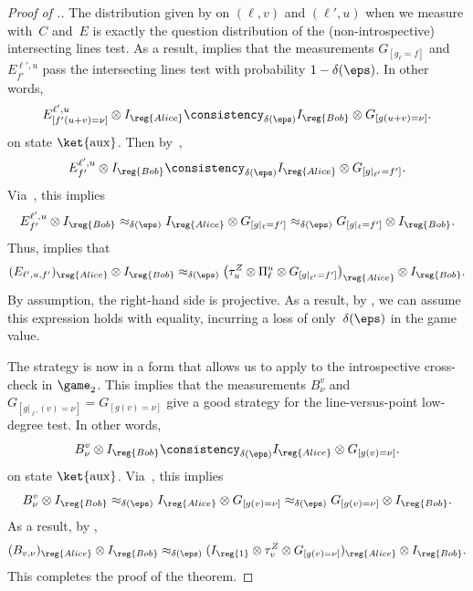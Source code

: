 \begin{proof}[Proof of .]
The distribution given by on $(\ell, v)$ and $(\ell', u)$ when we measure with~$C$ and~$E$ is exactly
the question distribution of the (non-introspective) intersecting lines test.
As a result,  implies that
the measurements $G_{[g_{\ell} = f]}$ and $E^{\ell', u}_{f'}$ pass the intersecting lines test with probability $1-\delta(\eps)$.
In other words,
\begin{equation*}
E^{\ell',u}_{[f'(u+v) = \nu]} \otimes I_{\reg{Alice}}
\consistency_{\delta(\eps)} I_{\reg{Bob}} \otimes G_{[g(u+v) = \nu]}.
\end{equation*}
on state $\ket{\mathrm{aux}}$.
Then by~, 
\begin{equation*}
E^{\ell',u}_{f'} \otimes I_{\reg{Bob}}
\consistency_{\delta(\eps)} I_{\reg{Alice}} \otimes G_{[g|_{\ell'} = f']}.
\end{equation*}
Via~, this implies
\begin{equation*}
E^{\ell',u}_{f'} \otimes I_{\reg{Bob}}
\approx_{\delta(\eps)} I_{\reg{Alice}} \otimes G_{[g|_{\ell} = f']}
\approx_{\delta(\eps)} G_{[g|_{\ell} = f']} \otimes I_{\reg{Bob}}.
\end{equation*}
Thus,  implies that
\begin{equation*}
(E_{\ell', u, f'})_{\reg{Alice}} \otimes I_{\reg{Bob}}
\approx_{\delta(\eps)} \left(\tau_u^Z \otimes \Pi_{\ell}^u \otimes G_{[g|_{\ell'} = f']}\right)_{\reg{Alice}} \otimes I_{\reg{Bob}}.
\end{equation*}
By assumption, the right-hand side is projective.
As a result, by , we can assume this expression holds with equality, incurring a loss of only~$\delta(\eps)$ in the game value.

The strategy is now in a form that allows us to apply 
to the introspective cross-check in $\game_2$.
This implies that the measurements $B^v_{\nu}$ and $G_{[g|_{\ell'}(v) = \nu]} = G_{[g(v) = \nu]}$  give a good strategy for the line-versus-point low-degree test. In other words,
\begin{equation*}
B^v_{\nu} \otimes I_{\reg{Bob}} \consistency_{\delta(\eps)} I_{\reg{Alice}} \otimes G_{[g(v)=\nu]}.
\end{equation*}
on state $\ket{\mathrm{aux}}$.
Via~, this implies
\begin{equation*}
B^{v}_{\nu} \otimes I_{\reg{Bob}}
\approx_{\delta(\eps)} I_{\reg{Alice}} \otimes G_{[g(v) = \nu]}
\approx_{\delta(\eps)} G_{[g(v) = \nu]} \otimes I_{\reg{Bob}}.
\end{equation*}
As a result, by ,
\begin{equation*}
(B_{v, \nu})_{\reg{Alice}} \otimes I_{\reg{Bob}} \approx_{\delta(\eps)} (I_{\reg{1}} \otimes \tau_v^Z \otimes G_{[g(v) = \nu]})_{\reg{Alice}} \otimes I_{\reg{Bob}}.
\end{equation*}
This completes the proof of the theorem.
\end{proof}


